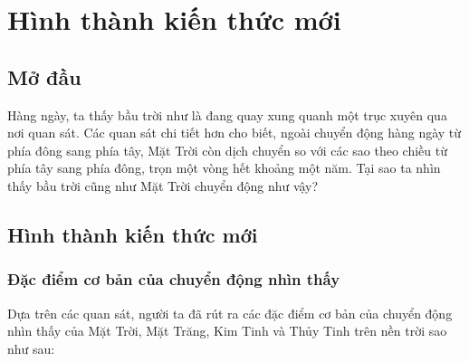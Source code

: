 \setcounter{section}{0}
\section{Hình thành kiến thức mới}

\subsection{Mở đầu}
Hàng ngày, ta thấy bầu trời như là đang quay xung quanh một trục xuyên qua nơi quan sát. Các quan sát chi tiết hơn cho biết, ngoài chuyển động hàng ngày từ phía đông sang phía tây, Mặt Trời còn dịch chuyển so với các sao theo chiều từ phía tây sang phía đông, trọn một vòng hết khoảng một năm. Tại sao ta nhìn thấy bầu trời cũng như Mặt Trời chuyển động như vậy?
\subsection{Hình thành kiến thức mới}
\subsubsection{Đặc điểm cơ bản của chuyển động nhìn thấy}
Dựa trên các quan sát, người ta đã rút ra các đặc điểm cơ bản của chuyển động nhìn thấy của Mặt Trời, Mặt Trăng, Kim Tinh và Thủy Tinh trên nền trời sao như sau:

